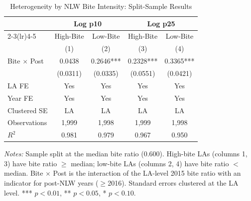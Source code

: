 \begin{table}[htbp]
\centering
\caption{Heterogeneity by NLW Bite Intensity: Split-Sample Results}
\label{tab:heterogeneity}
\small
\begin{tabular}{lcccc}
\hline\hline
 & \multicolumn{2}{c}{Log p10} & \multicolumn{2}{c}{Log p25} \\
\cmidrule(lr){2-3}\cmidrule(lr){4-5}
 & High-Bite & Low-Bite & High-Bite & Low-Bite \\
 & (1) & (2) & (3) & (4) \\
\hline
Bite $\times$ Post & 0.0438 & 0.2646*** & 0.2328*** & 0.3365*** \\
 & (0.0311) & (0.0335) & (0.0551) & (0.0421) \\
\hline
LA FE        & Yes & Yes & Yes & Yes \\
Year FE      & Yes & Yes & Yes & Yes \\
Clustered SE & LA  & LA  & LA  & LA  \\
Observations & 1,999 & 1,998 & 1,999 & 1,998 \\
$R^2$        & 0.981 & 0.979 & 0.967 & 0.950 \\
\hline\hline
\end{tabular}
\raggedright\footnotesize\textit{Notes:} Sample split at the median bite ratio (0.600). High-bite LAs (columns 1, 3) have bite ratio $\geq$ median; low-bite LAs (columns 2, 4) have bite ratio $<$ median. Bite $\times$ Post is the interaction of the LA-level 2015 bite ratio with an indicator for post-NLW years ($\geq$2016). Standard errors clustered at the LA level. *** $p<0.01$, ** $p<0.05$, * $p<0.10$.
\end{table}
